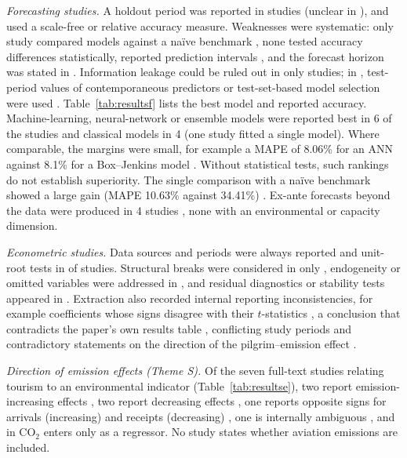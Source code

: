 \documentclass[11pt,a4paper]{article}
\begin{document}
\emph{Forecasting studies.} A holdout period was reported in \NrobFA{} studies (unclear in \NrobFAunc{}), and \NrobFC{} used a scale-free or relative accuracy measure. Weaknesses were systematic: only \NrobFB{} study compared models against a na\"ive benchmark \citep{Kurtulay2024}, none tested accuracy differences statistically, \NrobFG{} reported prediction intervals \citep{Alamoudi2020}, and the forecast horizon was stated in \NrobFF{}. Information leakage could be ruled out in only \NrobFE{} studies; in \NrobFEno{}, test-period values of contemporaneous predictors or test-set-based model selection were used \citep{AlShehhi2018,Alsulami2026,Bilek2025}. Table~\ref{tab:resultsf} lists the best model and reported accuracy. Machine-learning, neural-network or ensemble models were reported best in 6 of the \NftF{} studies and classical models in 4 (one study fitted a single model). Where comparable, the margins were small, for example a MAPE of 8.06\% for an ANN against 8.1\% for a Box--Jenkins model \citep{Cuhadar2020}. Without statistical tests, such rankings do not establish superiority. The single comparison with a na\"ive benchmark showed a large gain (MAPE 10.63\% against 34.41\%) \citep{Kurtulay2024}. Ex-ante forecasts beyond the data were produced in 4 studies \citep{Alamoudi2020,Alsulami2026,Bilek2025,Kayral2023}, none with an environmental or capacity dimension.

\emph{Econometric studies.} Data sources and periods were always reported and unit-root tests in \NrobEA{} of \NftE{} studies. Structural breaks were considered in only \NrobEC{}, endogeneity or omitted variables were addressed in \NrobEE{}, and residual diagnostics or stability tests appeared in \NrobEF{}. Extraction also recorded internal reporting inconsistencies, for example coefficients whose signs disagree with their $t$-statistics \citep{Majumdar2022}, a conclusion that contradicts the paper's own results table \citep{Ouassou2022}, conflicting study periods \citep{Wada2021} and contradictory statements on the direction of the pilgrim--emission effect \citep{Naseem2025}.

\emph{Direction of emission effects (Theme S).} Of the seven full-text studies relating tourism to an environmental indicator (Table~\ref{tab:resultse}), two report emission-increasing effects \citep{Majumdar2022,Bildirici2025}, two report decreasing effects \citep{Voumik2023,Zmami2024}, one reports opposite signs for arrivals (increasing) and receipts (decreasing) \citep{Bahar2023}, one is internally ambiguous \citep{Naseem2025}, and in \citet{Jamel2020} CO$_2$ enters only as a regressor. No study states whether aviation emissions are included.
\end{document}
